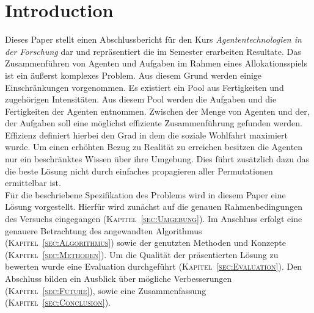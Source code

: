 \documentclass[fleqn,10pt]{SelfArx} %
\newcommand{\ChapterCite}[1]{\textsc{Kapitel~\ref{#1}}}
\begin{document}
\flushbottom %

\maketitle %

\tableofcontents %

\thispagestyle{empty} %


\section*{Introduction} %
\label{sec:introduction}


Dieses Paper stellt einen Abschlussbericht für den Kurs \textit{Agententechnologien in der Forschung} dar und repräsentiert die im Semester erarbeiten Resultate. Das Zusammenführen von Agenten und Aufgaben im Rahmen eines Allokationsspiels ist ein äußerst komplexes Problem. Aus diesem Grund werden einige Einschränkungen vorgenommen. Es existiert ein Pool aus Fertigkeiten und zugehörigen Intensitäten. Aus diesem Pool werden die Aufgaben und die Fertigkeiten der Agenten entnommen. Zwischen der Menge von Agenten und der, der Aufgaben soll eine möglichst effiziente Zusammenführung gefunden werden. Effizienz definiert hierbei den Grad in dem die soziale Wohlfahrt maximiert wurde. Um einen erhöhten Bezug zu Realität zu erreichen besitzen die Agenten nur ein beschränktes Wissen über ihre Umgebung. Dies führt zusätzlich dazu das die beste Lösung nicht durch einfaches propagieren aller Permutationen ermittelbar ist. \\
Für die beschriebene Spezifikation des Problems wird in diesem Paper eine Lösung vorgestellt. Hierfür wird zunächst auf die genauen Rahmenbedingungen des Versuchs eingegangen (\ChapterCite{sec:Umgebung}). Im Anschluss erfolgt eine genauere Betrachtung des angewandten Algorithmus (\ChapterCite{sec:Algorithmus}) sowie der genutzten Methoden und Konzepte (\ChapterCite{sec:Methoden}). Um die Qualität der präsentierten Lösung zu bewerten wurde eine Evaluation durchgeführt (\ChapterCite{sec:Evaluation}). Den Abschluss bilden ein Ausblick über mögliche Verbesserungen (\ChapterCite{sec:Future}), sowie eine Zusammenfassung (\ChapterCite{sec:Conclusion}). 
\end{document}
